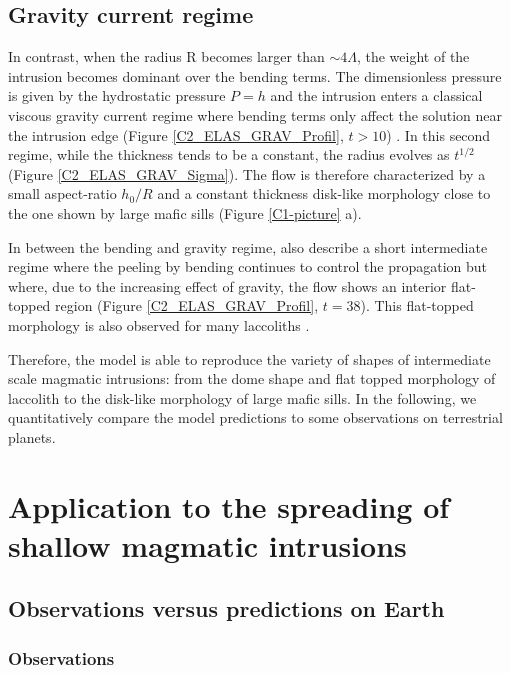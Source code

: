 \subsection{Gravity current regime}
\label{C2-sec:grav-curr-regime}

In contrast,  when the radius  R becomes larger than  $\sim 4\Lambda$,
the weight of  the intrusion becomes dominant over  the bending terms.
The  dimensionless  pressure  is  given by  the  hydrostatic  pressure
$P = h$  and the intrusion enters a classical  viscous gravity current
regime where bending terms only affect the solution near the intrusion
edge         (Figure        \ref{C2_ELAS_GRAV_Profil},         $t>10$)
\citep{Huppert:1982a,Michaut:2011kg,Lister:2013ia}.   In  this  second
regime, while the thickness tends to be a constant, the radius evolves
as $t^{1/2}$ (Figure \ref{C2_ELAS_GRAV_Sigma}).  The flow is therefore
characterized by a small aspect-ratio $h_0/R$ and a constant thickness
disk-like  morphology close  to the  one  shown by  large mafic  sills
(Figure \ref{C1-picture} a).

In between the bending  and gravity regime, \citet{Lister:2013ia} also
describe  a short  intermediate regime  where the  peeling by  bending
continues to control the propagation  but where, due to the increasing
effect  of gravity,  the  flow shows  an  interior flat-topped  region
(Figure   \ref{C2_ELAS_GRAV_Profil},    $t=38$).    This   flat-topped
morphology     is     also     observed    for     many     laccoliths
\citep{Koch:1981if,Bunger:2011cb}.

Therefore, the  model is able  to reproduce  the variety of  shapes of
intermediate scale magmatic  intrusions: from the dome  shape and flat
topped morphology  of laccolith to  the disk-like morphology  of large
mafic sills.   In the following,  we quantitatively compare  the model
predictions to some observations on terrestrial planets.


\section{Application to the spreading of shallow magmatic intrusions}
\label{C2-sec:appl-earth-moon}

\subsection{Observations versus predictions on Earth}
\label{C2-sec:observ-vs-pred-Earth}

\subsubsection*{Observations}

